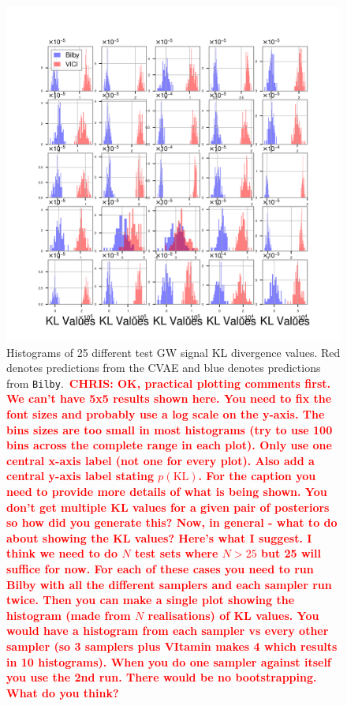 \documentclass[%
showpacs,
 amsmath,amssymb,
 aps,
 twocolumn,
 prl,
 reprint,
floatfix,
]{revtex4-1}
\newcommand{\chris}[1]{\textbf{\textcolor{red}{CHRIS: #1}}}
\begin{document}
%
%

%
%
\begin{figure}
    \includegraphics[width=\columnwidth]{images/hist-kl_0.png}
    \caption{\label{fig:kl_results} Histograms of 25 different test GW signal
\ac{KL} divergence values.  Red denotes predictions from the CVAE and blue denotes
predictions from \texttt{Bilby}.~\chris{OK, practical plotting comments first.
We can't have 5x5 results shown here. You need to fix the font sizes and
probably use a log scale on the y-axis. The bins sizes are too small in most
histograms (try to use 100 bins across the complete range in each plot). Only
use one central x-axis label (not one for every plot). Also add a central
y-axis label stating $p(\text{KL})$. For the caption you need to provide more
details of what is being shown. You don't get multiple KL values for a given
pair of posteriors so how did you generate this? Now, in general - what to do
about showing the KL values? Here's what I suggest. I think we need to do $N$
test sets where $N>25$ but 25 will suffice for now. For each of these cases you
need to run Bilby with all the different samplers and each sampler run twice.
Then you can make a single plot showing the histogram (made from $N$
realisations) of KL values. You would have a histogram from each sampler vs
every other sampler (so 3 samplers plus VItamin makes 4 which results in 10
histograms). When  you do one sampler against itself you use the 2nd run. There
would be no bootstrapping. What do you think?}}
\end{figure}
\end{document}
